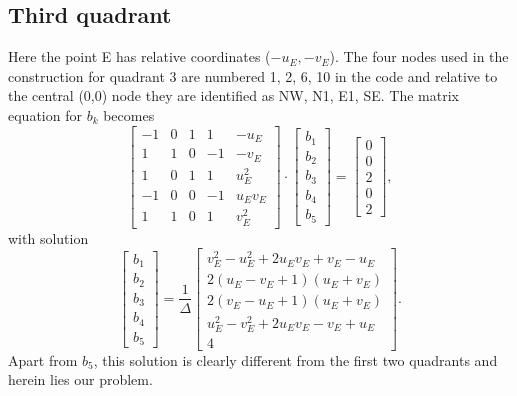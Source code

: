 \documentclass[12pt,letterpaper,margin=0.5in]{report}
\begin{document}
\subsection{Third quadrant}
Here the point E has relative coordinates ($-u_E, -v_E$).  The four nodes used in the
construction for quadrant 3 are numbered 1, 2, 6, 10 in the code and relative to the central (0,0) node they
are identified as NW, N1, E1, SE. The matrix equation for $b_k$ becomes
\begin{equation}
\left[ {\begin{array}{*{20}{r}}
{ - 1}&0&1&1&{ - {u_E}}\\
1&1&0&{ - 1}&{ - {v_E}}\\
1&0&1&1&{u_E^2}\\
{ - 1}&0&0&{ - 1}&{{u_E}{v_E}}\\
1&1&0&1&{v_E^2}
\end{array}} \right] \cdot \left[ {\begin{array}{*{20}{c}}
{{b_1}}\\
{{b_2}}\\
{{b_3}}\\
{{b_4}}\\
{{b_5}}
\end{array}} \right] = \left[ {\begin{array}{*{20}{c}}
0\\
0\\
2\\
0\\
2
\end{array}} \right],
\end{equation}
with solution
\begin{equation}
\left[ {\begin{array}{*{20}{c}}
{{b_1}}\\
{{b_2}}\\
{{b_3}}\\
{{b_4}}\\
{{b_5}}
\end{array}} \right] = \frac{1}{\Delta }\left[ {\begin{array}{*{20}{c}}
{v_E^2 - u_E^2 + 2{u_E}{v_E} + {v_E} - {u_E}}\\[4pt]
{2\left( {{u_E} - {v_E} + 1} \right)\left( {{u_E} + {v_E}} \right)}\\[4pt]
{2\left( {{v_E} - {u_E} + 1} \right)\left( {{u_E} + {v_E}} \right)}\\[4pt]
{u_E^2 - v_E^2 + 2{u_E}{v_E} - {v_E} + {u_E}}\\[4pt]
4
\end{array}} \right].
\label{eq:lower}
\end{equation}
Apart from $b_5$, this solution is clearly different from the first two quadrants and herein lies our problem.
\end{document}
